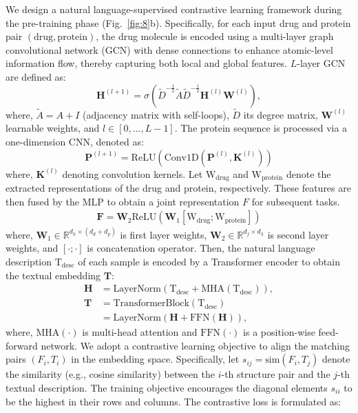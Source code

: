 \documentclass[unnumsec,webpdf,contemporary,large]{oup-authoring-template}%
\theoremstyle{thmstyleone}%
\theoremstyle{thmstyletwo}%
\theoremstyle{thmstylethree}%
\begin{document}
We design a natural language-supervised contrastive learning framework during the pre-training phase (Fig.~\ref{fig:8}b). Specifically, for each input drug and protein pair $(\text{drug},\text{protein})$, the drug molecule is encoded using a multi-layer graph convolutional network (GCN) with dense connections to enhance atomic-level information flow, thereby capturing both local and global features. $L$-layer GCN are defined as:
\begin{equation}
    \mathbf{H}^{(l+1)} = \sigma\left( \tilde{D}^{-\frac{1}{2}}\tilde{A}\tilde{D}^{-\frac{1}{2}}\mathbf{H}^{(l)}\mathbf{W}^{(l)} \right),
\end{equation}
where, $\tilde{A} = A + I$ (adjacency matrix with self-loops), $\tilde{D}$ its degree matrix, $\mathbf{W}^{(l)}$ learnable weights, and $l \in [0,...,L-1]$. The protein sequence is processed via a one-dimension CNN, denoted as:
\begin{equation*}
    \mathbf{P}^{(l+1)} = \text{ReLU}\left( \text{Conv1D}(\mathbf{P}^{(l)}, \mathbf{K}^{(l)}) \right)
\end{equation*}
where, $\mathbf{K}^{(l)}$ denoting convolution kernels. Let $\text{W}_{\text{drug}}$ and $\text{W}_{\text{protein}}$ denote the extracted representations of the drug and protein, respectively. These features are then fused by the MLP to obtain a joint representation $F$ for subsequent tasks.
\begin{align}
\mathbf{F} = \mathbf{W}_2 \text{ReLU}(\mathbf{W}_1 [\text{W}_{\text{drug}}; \text{W}_{\text{protein}}])
\end{align}
where, $\mathbf{W}_1 \in \mathbb{R}^{d_h \times (d_d + d_p)}$ is first layer weights, $\mathbf{W}_2 \in \mathbb{R}^{d_f \times d_h}$
is second layer weights, and $[\cdot;\cdot]$ is concatenation operator. Then, the natural language description $\text{T}_\text{desc}$ of each sample is encoded by a Transformer encoder to obtain the textual embedding $\mathbf{T}$:
\begin{align}
\mathbf{H} &= \text{LayerNorm}(\text{T}_\text{desc} + \text{MHA}(\text{T}_\text{desc})),\\
\mathbf{T} &= \text{TransformerBlock}(\text{T}_\text{desc}) \\ \nonumber
&= \text{LayerNorm}(\mathbf{H} + \text{FFN}(\mathbf{H})),
\end{align}
where, $\text{MHA}(\cdot)$ is multi-head attention and $\text{FFN}(\cdot)$ is a position-wise feed-forward network. We adopt a contrastive learning objective to align the matching pairs $(F_i, T_i)$ in the embedding space. Specifically, let $s_{ij} = \text{sim}(F_i, T_j)$ denote the similarity (e.g., cosine similarity) between the $i$-th structure pair and the $j$-th textual description. The training objective encourages the diagonal elements $s_{ii}$ to be the highest in their rows and columns. The contrastive loss is formulated as:
\end{document}

